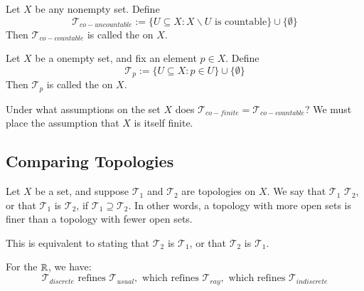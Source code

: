 \documentclass[12pt, a4paper, oneside, openright, titlepage]{book}
\begin{document}
\begin{eg}
    Let $X$ be any nonempty set. Define \begin{equation*}
        \mathcal{T}_{co-uncountable} := \{U\subseteq X:X\backslash U\text{ is countable}\}\cup\{\emptyset\}
    \end{equation*}
    Then $\mathcal{T}_{co-countable}$ is called the  on $X$.
\end{eg}

\begin{eg}
    Let $X$ be a onempty set, and fix an element $p \in X$. Define \begin{equation*}
        \mathcal{T}_p :=\{U\subseteq X:p \in U\}\cup\{\emptyset\}
    \end{equation*}
    Then $\mathcal{T}_p$ is called the  on $X$.
\end{eg}

\begin{xca}
    Under what assumptions on the set $X$ does $\mathcal{T}_{co-finite} = \mathcal{T}_{co-countable}$? We must place the assumption that $X$ is itself finite.
\end{xca}


\subsection{Comparing Topologies}


\begin{defn}
    Let $X$ be a set, and suppose $\mathcal{T}_1$ and $\mathcal{T}_2$ are topologies on $X$. We say that $\mathcal{T}_1$  $\mathcal{T}_2$, or that $\mathcal{T}_1$ is  $\mathcal{T}_2$, if $\mathcal{T}_1 \supseteq \mathcal{T}_2$. In other words, a topology with more open sets is finer than a topology with fewer open sets.

    This is equivalent to stating that $\mathcal{T}_2$ is  $\mathcal{T}_1$, or that $\mathcal{T}_2$ is  $\mathcal{T}_1$.
\end{defn}


\begin{eg}
    For the $\mathbb R$, we have: \begin{equation*}
        \mathcal{T}_{discrete} \text{ refines }\mathcal{T}_{usual}, \text{ which refines }\mathcal{T}_{ray}, \text{ which refines }\mathcal{T}_{indiscrete}
    \end{equation*}
\end{eg}
\end{document}
